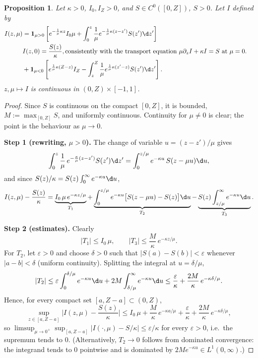 \documentclass[11pt,a4paper]{article}
\newtheorem{proposition}{Proposition}
\theoremstyle{remark}
\begin{document}
\begin{proposition}
Let $\kappa>0$, $I_0,I_Z>0$, and $S\in C^0([0,Z])$, $S>0$. Let $I$ defined by
\begin{align}
	I (z,\mu) &= {\bf 1}_{\mu>0}\left[ {e}^{-\frac1\mu \kappa  z }I_0\mu
	+ \int_{0}^z \frac1\mu{e}^{-\frac1\mu \kappa (z-z')}S(z')\d z'\right]
\cr&
I(z,0) =\frac{S(z)}\kappa, \hbox{consistently with the transport equation
$\mu\partial_z I+\kappa I=S$ at $\mu=0$.}
\cr&
	+ {\bf 1}_{\mu<0}\left[ {e}^{\frac1\mu \kappa (Z-z) }I_Z
	- \int_{z}^Z \frac1\mu{e}^{\frac1\mu \kappa (z'-z)}S(z')\d z'\right].
\end{align}
$z,\mu \mapsto I$ is continuous in $(0,Z)\times[-1,1]$.
\end{proposition}
%
\begin{proof}

Since $S$ is continuous on the compact $[0,Z]$, it is bounded, $M:=\max_{[0,Z]}S$,
and uniformly continuous. Continuity for $\mu\neq0$ is clear; the point is the
behaviour as $\mu\to0$.

\medskip
\noindent\textbf{Step 1 (rewriting, $\mu>0$).}
The change of variable $u=(z-z')/\mu$ gives
\[
\int_{0}^z \frac1\mu\,{e}^{-\frac{\kappa}{\mu}(z-z')}S(z')\d z'
=\int_0^{z/\mu}{e}^{-\kappa u}\,S(z-\mu u)\d u ,
\]
and since $S(z)/\kappa=S(z)\int_0^\infty{e}^{-\kappa u}\d u$,
\begin{equation}\label{eq:split}
I(z,\mu)-\frac{S(z)}{\kappa}
=\underbrace{I_0\,\mu\,{e}^{-\kappa z/\mu}}_{T_1}
+\underbrace{\int_0^{z/\mu}{e}^{-\kappa u}\big[S(z-\mu u)-S(z)\big]\d u}_{T_2}
-\underbrace{S(z)\int_{z/\mu}^{\infty}{e}^{-\kappa u}\d u}_{T_3}.
\end{equation}

\medskip
\noindent\textbf{Step 2 (estimates).}
Clearly
\[
|T_1|\le I_0\,\mu,
\qquad
|T_3|\le \frac{M}{\kappa}\,{e}^{-\kappa z/\mu}.
\]
For $T_2$, let $\varepsilon>0$ and choose $\delta>0$ such that
$|S(a)-S(b)|<\varepsilon$ whenever $|a-b|<\delta$ (uniform continuity).
Splitting the integral at $u=\delta/\mu$,
\[
|T_2|\le \varepsilon\int_0^{\delta/\mu}{e}^{-\kappa u}\d u
+2M\int_{\delta/\mu}^{\infty}{e}^{-\kappa u}\d u
\le \frac{\varepsilon}{\kappa}+\frac{2M}{\kappa}\,{e}^{-\kappa\delta/\mu}.
\]
Hence, for every compact set $[a,Z-a]\subset(0,Z)$,
\begin{equation}\label{eq:unif}
\sup_{z\in[a,Z-a]}\Big|I(z,\mu)-\frac{S(z)}{\kappa}\Big|
\le I_0\,\mu+\frac{M}{\kappa}\,{e}^{-\kappa a/\mu}
+\frac{\varepsilon}{\kappa}+\frac{2M}{\kappa}\,{e}^{-\kappa\delta/\mu},
\end{equation}
so $\limsup_{\mu\to0^+}\sup_{[a,Z-a]}|I(\cdot,\mu)-S/\kappa|\le\varepsilon/\kappa$
for every $\varepsilon>0$, i.e.\ the supremum tends to $0$.
(Alternatively, $T_2\to0$ follows from dominated convergence: the integrand tends
to $0$ pointwise and is dominated by $2M{e}^{-\kappa u}\in L^1(0,\infty)$.)


\end{proof}
\end{document}
